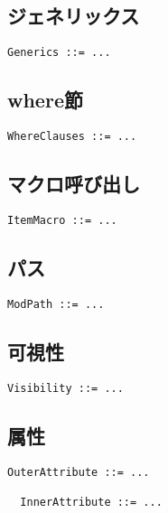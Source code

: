 \documentclass[dvipdfmx,uplatex,papersize,a4paper,10pt]{jsbook}
\theoremstyle{definition}
\begin{document}
\subsection{ジェネリックス}

\begin{lstlisting}[language=BNFLike, gobble=2]
  Generics ::= ...
\end{lstlisting}

\subsection{where節}

\begin{lstlisting}[language=BNFLike, gobble=2]
  WhereClauses ::= ...
\end{lstlisting}

\subsection{マクロ呼び出し}

\begin{lstlisting}[language=BNFLike, gobble=2]
  ItemMacro ::= ...
\end{lstlisting}

\subsection{パス}

\begin{lstlisting}[language=BNFLike, gobble=2]
  ModPath ::= ...
\end{lstlisting}

\subsection{可視性}

\begin{lstlisting}[language=BNFLike, gobble=2]
  Visibility ::= ...
\end{lstlisting}

\subsection{属性}

\begin{lstlisting}[language=BNFLike, gobble=2]
  OuterAttribute ::= ...

  InnerAttribute ::= ...
\end{lstlisting}
\end{document}

